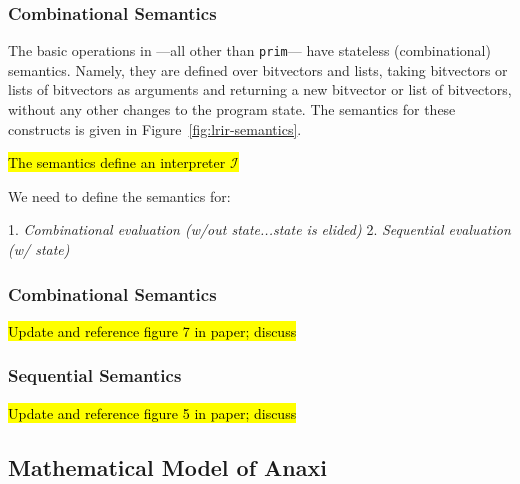 \subsubsection{Combinational Semantics}

The basic operations in \lrir%
  ---all other than \texttt{prim}---%
  have stateless (combinational) semantics.
Namely, they are defined over
  bitvectors and lists,
  taking bitvectors or lists of bitvectors as arguments
  and returning a new bitvector or list of bitvectors,
  without any other changes
  to the program state.
The semantics for these constructs 
  is given in Figure~\ref{fig:lrir-semantics}.



\hl{The semantics define an interpreter $\mathcal{I}$}

We need to define the semantics for:

1. \textit{Combinational evaluation (w/out state...state is elided)}
2. \textit{Sequential evaluation (w/ state)}


\subsubsection{Combinational Semantics}
\hl{Update and reference figure 7 in paper; discuss}

\subsubsection{Sequential Semantics}
\hl{Update and reference figure 5 in paper; discuss}

\subsection{Mathematical Model of Anaxi}

